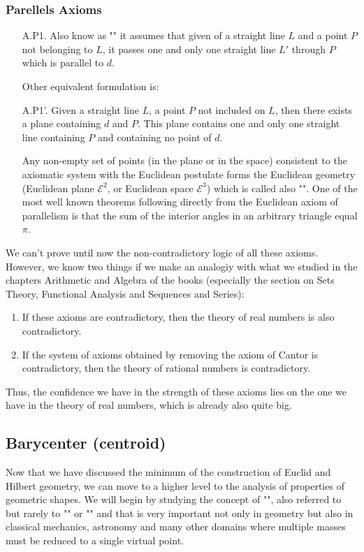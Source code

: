 	\subsubsection{Parellels Axioms}
	\begin{enumerate}
		\item[A.P1.] Also know as "" it assumes that given of a straight line $L$ and a point $P$ not belonging to $L$, it passes one and only one straight line $L'$ through $P$ which is parallel to $d$.
		
		Other equivalent formulation is:
	
		\item[A.P1'.] Given a straight line $L$, a point $P$ not included on $L$, then there exists a plane containing $d$ and $P$. This plane contains one and only one straight line containing $P$ and containing no point of $d$.
		
		Any non-empty set of points (in the plane or in the space) consistent to the axiomatic system with the Euclidean postulate forms the Euclidean geometry (Euclidean plane $\mathcal{E}^2$, or Euclidean space $\mathcal{E}^3$) which is called also "". One of the most well known theorems following directly from the Euclidean axiom of parallelism is that the sum of the interior angles in an arbitrary triangle equal $\pi$.
	\end{enumerate}
	
	We can't prove until now the non-contradictory logic of all these axioms. However, we know two things if we make an analogiy with what we studied in the chapters Arithmetic and Algebra of the books (especially the section on Sets Theory, Functional Analysis and Sequences and Series):
   \begin{enumerate}
      \item If these axioms are contradictory, then the theory of real numbers is also contradictory.

      \item If the system of axioms obtained by removing the axiom of Cantor is contradictory, then the theory of rational numbers is contradictory.
   \end{enumerate}
   Thus, the confidence we have in the strength of these axioms lies on the one we have in the theory of real numbers, which is already also quite big.
   
   \pagebreak
   \subsection{Barycenter (centroid)}\label{barycenter}
   Now that we have discussed the minimum of the construction of Euclid and Hilbert geometry, we can move to a higher level to the analysis of properties of geometric shapes. We will begin by studying the concept of "", also referred to but rarely to "" or "" and that is very important not only in geometry but also in classical mechanics, astronomy and many other domains where multiple masses must be reduced to a single virtual point.
   
